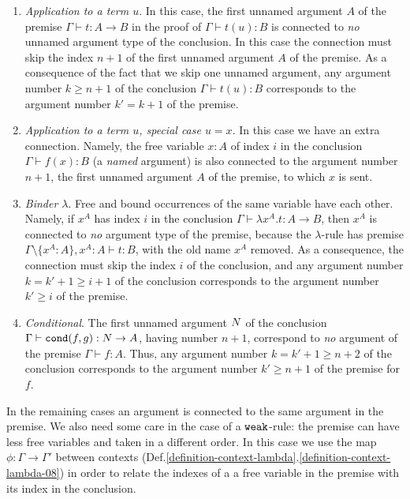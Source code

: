 \begin{enumerate}

\item
\emph{Application to a term $u$}. 
In this case, the first unnamed argument $A$ of the premise 
$\Gamma \vdash t:A \rightarrow B$ in 
the proof of $\Gamma \vdash t(u):B$ is connected to \emph{no} 
unnamed argument type of the conclusion.
In this case the connection must skip the index $n+1$
of the first unnamed argument $A$ of the premise. As a consequence
of the fact that we skip one unnamed argument, any argument number 
$k \ge n+1$ of the conclusion $\Gamma \vdash t(u):B$
corresponds to the argument number $k' = k+1$ of the premise. 

\item
\emph{Application to a term $u$, special case $u=x$}. 
In this case we have an extra connection. 
Namely, the free variable $x:A$ of index $i$ in the conclusion 
$\Gamma \vdash f(x) : B$ (a \emph{named} argument) 
is also connected to the argument number $n+1$, the 
first unnamed argument $A$ of the premise, to which $x$ is sent.

\item
\emph{Binder $\lambda$}. Free and bound occurrences of the same variable
have  each other.
Namely, if $x^A$ has index $i$ in the conclusion 
$\Gamma \vdash \lambda x^A.t : A \rightarrow B$, 
then $x^A$ is connected to \emph{no} argument type of the premise, because the 
$\lambda$-rule has premise 
$\Gamma \setminus \{x^A:A\}, x^A:A \vdash t : B$, 
with the old name $x^A$ removed.
As a consequence, the connection must skip the index $i$ of the conclusion,
and any argument number $k=k'+1 \ge i+1$ of the conclusion 
corresponds to the argument number $k' \ge i$ of the premise. 

\item
\emph{Conditional}.
The first unnamed argument ${N}$ of the conclusion 
$\Gamma \vdash {\tt cond}(f,g):{N} \rightarrow A$, having number $n+1$, 
correspond to \emph{no} argument of the premise $\Gamma \vdash f:A$. 
Thus, any argument number $k = k'+1 \ge n+2$ 
of the conclusion corresponds to the argument 
number $k' \ge n+1$ of the premise for $f$. 
\end{enumerate}

In the remaining cases an argument is connected to the same argument in the 
premise. We also need some care in the case of a ${\tt weak}$-rule: the premise can
have less free variables and taken in a different order. 
In this case we use the map $\phi:\Gamma \rightarrow \Gamma'$ between contexts 
(Def.\ref{definition-context-lambda}.\ref{definition-context-lambda-08}) 
in order to relate the indexes of a a free variable in the premise with its index in the 
conclusion. 

